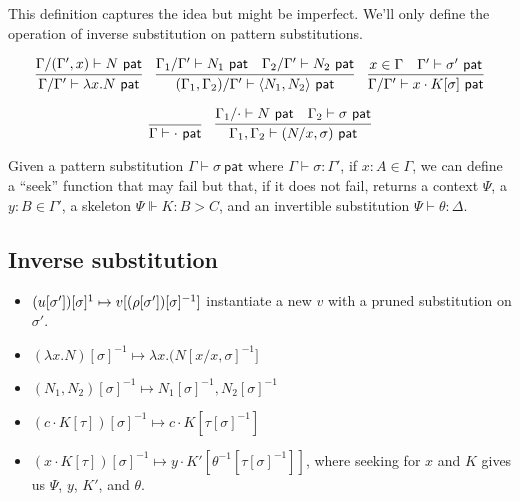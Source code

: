 \documentclass{article}
\begin{document}
This definition captures the idea but might be imperfect. We'll
only define the operation of inverse substitution on pattern substitutions.

\newcommand{\pat}{\mathsf{~pat}}

\[
\infer
{\Gamma / \Gamma' \vdash \lambda x.N \pat}
{\Gamma / (\Gamma', x) \vdash N \pat}
\quad
\infer
{(\Gamma_1, \Gamma_2) / \Gamma' \vdash \langle N_1, N_2 \rangle \pat}
{\Gamma_1 / \Gamma' \vdash N_1 \pat & \Gamma_2 / \Gamma' \vdash N_2 \pat}
\quad
\infer
{\Gamma / \Gamma' \vdash x \cdot K [ \sigma ] \pat}
{x \in \Gamma & \Gamma' \vdash \sigma' \pat}
\]

\[
\infer
{\Gamma \vdash \cdot \pat}{}
\quad
\infer
{\Gamma_1, \Gamma_2 \vdash (N/x, \sigma) \pat}
{\Gamma_1/ \cdot \vdash N \pat & \Gamma_2 \vdash \sigma \pat}
\]

Given a pattern substitution $\Gamma \vdash \sigma \pat$ 
where $\Gamma \vdash \sigma : \Gamma'$, if 
$x : A \in \Gamma$, we can define  a ``seek'' function that may fail
but that, if it does not fail, returns a context $\Psi$, a $y : B \in \Gamma'$,
a skeleton $\Psi \Vdash K : B > C$, and an invertible substitution 
$\Psi \vdash \theta : \Delta$. 

\subsection{Inverse substitution}

\begin{itemize}
\item $(u [\sigma']) [\sigma]^{\-1} \mapsto v[(\rho[\sigma'])[\sigma]^{-1}]$ instantiate a new $v$ with  a pruned
substitution on $\sigma'$.
\item $(\lambda x.N)[\sigma]^{-1} \mapsto \lambda x. (N[x/x,\sigma]^{-1}]$
\item $(N_1, N_2)[\sigma]^{-1} \mapsto N_1 [\sigma]^{-1}, N_2 [\sigma]^{-1}$
\item $(c \cdot K [\tau])[\sigma]^{-1} \mapsto c \cdot K [\tau[\sigma]^{-1}]$
\item $(x \cdot K [\tau])[\sigma]^{-1} \mapsto y \cdot K' [ \theta^{-1} [\tau[\sigma]^{-1}]]$, where seeking for $x$ and $K$ gives us $\Psi$, $y$, $K'$, and $\theta$.
\end{itemize}
\end{document}
